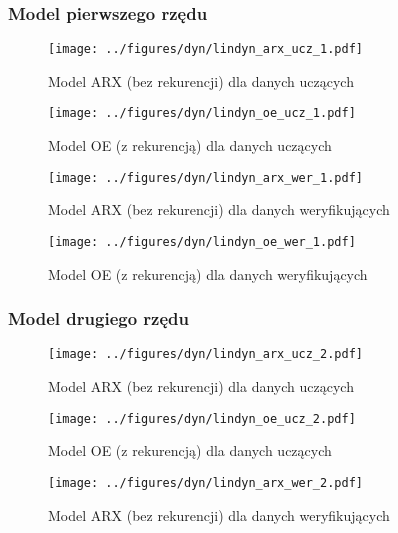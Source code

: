 \documentclass[a4paper,titlepage,11pt,floatssmall]{mwrep}
\begin{document}
\newpage

\subsubsection{Model pierwszego rzędu}

\begin{figure}[H]
\centering
\texttt{[image: ../figures/dyn/lindyn\_arx\_ucz\_1.pdf]}
\caption{Model ARX (bez rekurencji) dla danych uczących}
\end{figure}

\begin{figure}[H]
\centering
\texttt{[image: ../figures/dyn/lindyn\_oe\_ucz\_1.pdf]}
\caption{Model OE (z rekurencją) dla danych uczących}
\end{figure}

\begin{figure}[H]
\centering
\texttt{[image: ../figures/dyn/lindyn\_arx\_wer\_1.pdf]}
\caption{Model ARX (bez rekurencji) dla danych weryfikujących}
\end{figure}

\begin{figure}[H]
\centering
\texttt{[image: ../figures/dyn/lindyn\_oe\_wer\_1.pdf]}
\caption{Model OE (z rekurencją) dla danych weryfikujących}
\end{figure}

\subsubsection{Model drugiego rzędu}

\begin{figure}[H]
\centering
\texttt{[image: ../figures/dyn/lindyn\_arx\_ucz\_2.pdf]}
\caption{Model ARX (bez rekurencji) dla danych uczących}
\end{figure}

\begin{figure}[H]
\centering
\texttt{[image: ../figures/dyn/lindyn\_oe\_ucz\_2.pdf]}
\caption{Model OE (z rekurencją) dla danych uczących}
\end{figure}

\begin{figure}[H]
\centering
\texttt{[image: ../figures/dyn/lindyn\_arx\_wer\_2.pdf]}
\caption{Model ARX (bez rekurencji) dla danych weryfikujących}
\end{figure}
\end{document}
